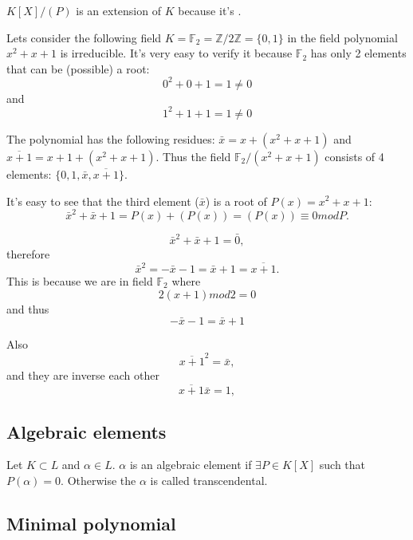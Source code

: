 $K\left[X\right]/\left(P\right)$ is an extension of $K$ because it's
.

\begin{example}
  Lets consider the following field
  $K = \mathbb{F}_2 = \mathbb{Z}/2\mathbb{Z} = \{0,1\}$ in the
  field polynomial $x^2+x+1$ is irreducible. It's very easy to verify
  it because $\mathbb{F}_2$ has only 2 elements that can be (possible)
  a root:
  \[
  0^2+0+1 = 1\ne 0
  \]
  and
  \[
  1^2+1+1 = 1\ne 0
  \]
  
  The polynomial has the following
  residues: $\bar{x} = x + \left(x^2+x+1\right)$ and
  $\overline{x + 1} = x + 1 + \left(x^2+x+1\right)$. Thus the field
  $\mathbb{F}_2/\left(x^2+x+1\right)$ consists of 4 elements:
  $\{0, 1, \bar{x}, \overline{x+1}\}$.

  It's easy to see that the third element ($\bar{x}$) is a root of
  $P(x) = x^2+x+1$:
  \[
  \bar{x}^2 + \bar{x} + 1 =
  P(x) + \left(P(x)\right) = \left(P(x)\right) \equiv 0 mod P.
  \]
  
  \[
  \bar{x}^2 + \bar{x} + 1 = \bar{0},
  \]
  therefore 
  \[
  \bar{x}^2 = - \bar{x} - 1 = \bar{x} + 1 = \overline{x+1}.
  \]
  This is because we are in field $\mathbb{F}_2$ where
  \[
  2 \left(x + 1\right) mod 2 = 0 
  \]
  and thus
  \[
  - \bar{x} - 1 = \bar{x} + 1
  \]
  
  Also
  \[
  \overline{x+1}^2 = \bar{x},
  \]
  and they are inverse each other
  \[
  \overline{x+1} \bar{x} = 1,
  \]
\end{example}

\subsection{Algebraic elements}

\begin{definition}
  Let $K \subset L$ and $\alpha \in L$. $\alpha$ is an algebraic
  element if $\exists P \in K\left[X\right]$ such that
    $P\left(\alpha\right) = 0$. Otherwise the $\alpha$ is called
    transcendental.
  \label{def:algebraicelement}
\end{definition}

\subsection{Minimal polynomial}

